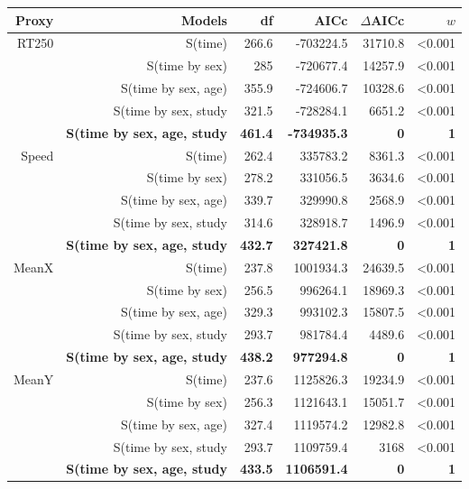 \documentclass[a4paper,11pt]{article}
\begin{document}
\begin{table}[htbp]
    \begin{tabular}{rrrrrr}
      \\
      \hline  
      Proxy & Models & df    & AICc  & $\Delta$AICc & $w$ \\
      \hline
      RT250 & S(time) & 266.6 & -703224.5 & 31710.8 & <0.001 \\
            & S(time by sex) & 285   & -720677.4 & 14257.9 & <0.001 \\
            & S(time by sex, age) & 355.9 & -724606.7 & 10328.6 & <0.001 \\
            & S(time by sex, study & 321.5 & -728284.1 & 6651.2 & <0.001 \\
            & \textbf{S(time by sex, age, study} & \textbf{461.4} & \textbf{-734935.3} & \textbf{0} & \textbf{1} \\        
      \hline
      Speed & S(time) & 262.4 & 335783.2 & 8361.3 & <0.001 \\
            & S(time by sex) & 278.2 & 331056.5 & 3634.6 & <0.001 \\
            & S(time by sex, age) & 339.7 & 329990.8 & 2568.9 & <0.001 \\
            & S(time by sex, study & 314.6 & 328918.7 & 1496.9 & <0.001 \\
            & \textbf{S(time by sex, age, study} & \textbf{432.7} & \textbf{327421.8} & \textbf{0} & \textbf{1} \\
      \hline
      MeanX & S(time) & 237.8 & 1001934.3 & 24639.5 & <0.001 \\
            & S(time by sex) & 256.5 & 996264.1 & 18969.3 & <0.001 \\
            & S(time by sex, age) & 329.3 & 993102.3 & 15807.5 & <0.001 \\
            & S(time by sex, study & 293.7 & 981784.4 & 4489.6 & <0.001 \\
            & \textbf{S(time by sex, age, study} & \textbf{438.2} & \textbf{977294.8} & \textbf{0} & \textbf{1} \\       
      \hline
      MeanY & S(time) & 237.6 & 1125826.3 & 19234.9 & <0.001 \\
            & S(time by sex) & 256.3 & 1121643.1 & 15051.7 & <0.001 \\
            & S(time by sex, age) & 327.4 & 1119574.2 & 12982.8 & <0.001 \\
            & S(time by sex, study & 293.7 & 1109759.4 & 3168  & <0.001 \\
            & \textbf{S(time by sex, age, study} & \textbf{433.5} & \textbf{1106591.4} & \textbf{0} & \textbf{1} \\
      \hline 
    \end{tabular}
  \end{table}
 
\end{document}
